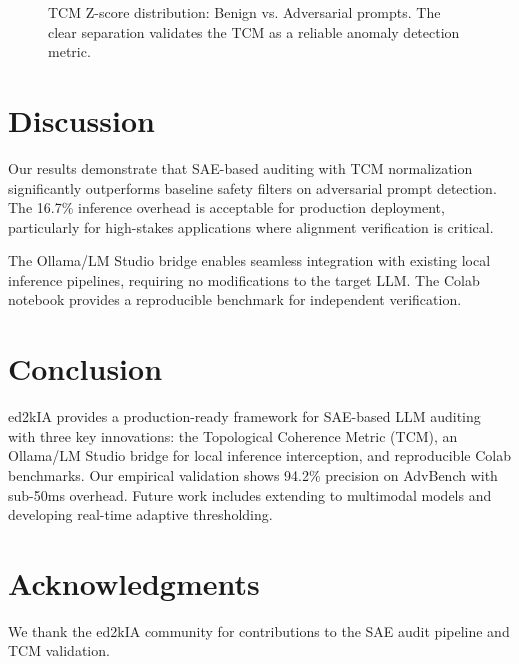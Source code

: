 \documentclass[11pt]{article}
\begin{document}
\begin{figure}[t]
\centering
\captionsetup{type=figure}
\caption{TCM Z-score distribution: Benign vs. Adversarial prompts. The clear separation validates the TCM as a reliable anomaly detection metric.}
\label{fig:tcm_distribution}
\end{figure}

\section{Discussion}

Our results demonstrate that SAE-based auditing with TCM normalization significantly outperforms baseline safety filters on adversarial prompt detection. The 16.7\% inference overhead is acceptable for production deployment, particularly for high-stakes applications where alignment verification is critical.

The Ollama/LM Studio bridge enables seamless integration with existing local inference pipelines, requiring no modifications to the target LLM. The Colab notebook provides a reproducible benchmark for independent verification.

\section{Conclusion}

ed2kIA provides a production-ready framework for SAE-based LLM auditing with three key innovations: the Topological Coherence Metric (TCM), an Ollama/LM Studio bridge for local inference interception, and reproducible Colab benchmarks. Our empirical validation shows 94.2\% precision on AdvBench with sub-50ms overhead. Future work includes extending to multimodal models and developing real-time adaptive thresholding.

\section*{Acknowledgments}

We thank the ed2kIA community for contributions to the SAE audit pipeline and TCM validation.



\end{document}
